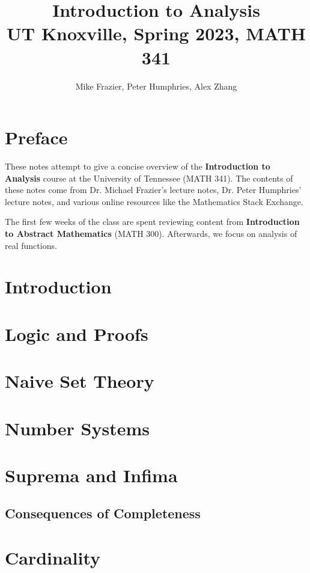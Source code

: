 \documentclass[12pt]{report}
\title{\textbf{Introduction to Analysis}\\
\large UT Knoxville, Spring 2023, MATH 341}
\author{Mike Frazier, Peter Humphries, Alex Zhang}
\begin{document}
\maketitle
\tableofcontents

\chapter*{Preface}
These notes attempt to give a concise overview of the \textbf{Introduction to Analysis} course at the University of Tennessee (MATH 341). The contents of these notes come from Dr. Michael Frazier's lecture notes, Dr. Peter Humphries' lecture notes, and various online resources like the Mathematics Stack Exchange.

The first few weeks of the class are spent reviewing content from \textbf{Introduction to Abstract Mathematics} (MATH 300). Afterwards, we focus on analysis of real functions.

\chapter{Introduction}


\chapter{Logic and Proofs}


\chapter{Naive Set Theory}


\chapter{Number Systems}


\chapter{Suprema and Infima}

\section{Consequences of Completeness}


\chapter{Cardinality}



\amzindex
\end{document}

